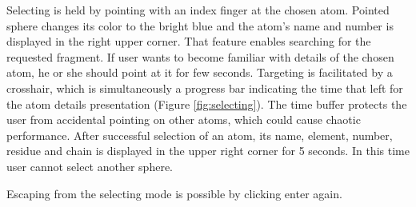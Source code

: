 Selecting is held by pointing with an index finger at the chosen atom. Pointed sphere changes its color to the bright blue and the atom's name and number is displayed in the right upper corner. That feature enables searching for the requested fragment. If user wants to become familiar with details of the chosen atom, he or she should point at it for few seconds. Targeting is facilitated by a crosshair, which is simultaneously a progress bar indicating the time that left for the atom details presentation (Figure \ref{fig:selecting}). The time buffer protects the user from accidental pointing on other atoms, which could cause chaotic performance.
After successful selection of an atom, its name, element, number, residue and chain is displayed in the upper right corner for 5 seconds. In this time user cannot select another sphere. 

Escaping from the selecting mode is possible by clicking enter again. 





